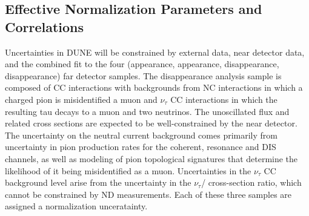 \subsection{Effective Normalization Parameters and Correlations}
\label{sec:syst_just}
Uncertainties in DUNE will be constrained by external data, near detector data, and the combined
fit to the four (\nue appearance, \anue appearance, \numu disappearance, \anumu disappearance) far detector samples.
The \numu disappearance analysis sample is composed of \numu CC interactions with backgrounds from NC
interactions in which a charged pion is misidentified a muon and $\nu_{\tau}$ CC interactions in which the resulting
tau decays to a muon and two neutrinos.
The unoscillated \numu flux and related cross sections are expected to be well-constrained by the near detector.
The uncertainty on the neutral current background comes primarily from uncertainty in pion production rates
for the coherent, resonance and DIS channels, as well as modeling of pion topological signatures that
determine the likelihood of it being misidentified as a muon.
Uncertainties in the $\nu_{\tau}$ CC background level arise from the uncertainty in the $\nu_{\tau}$/\numu
cross-section ratio, which cannot be constrained by ND measurements. Each of these three samples are
assigned a normalization unceratainty. 

